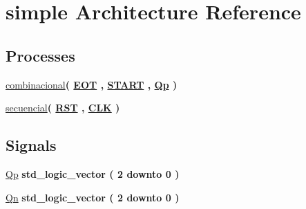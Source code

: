 \hypertarget{class_f_s_m16__control_1_1simple}{}\section{simple Architecture Reference}
\label{class_f_s_m16__control_1_1simple}
\subsection*{Processes}
 \begin{DoxyCompactItemize}
\item 
\hyperlink{class_f_s_m16__control_1_1simple_a523f88e0f05009828cb32efeb2cd80db}{combinacional}{\bfseries  ( {\bfseries {\bfseries \hyperlink{class_f_s_m16__control_a2410fb83e713378bb7e0f7ae0b31ea53}{E\+O\+T}} \textcolor{vhdlchar}{ }} , {\bfseries {\bfseries \hyperlink{class_f_s_m16__control_a85be3e029f471189e7375b9096e537b8}{S\+T\+A\+R\+T}} \textcolor{vhdlchar}{ }} , {\bfseries {\bfseries \hyperlink{class_f_s_m16__control_1_1simple_ab6f0a475b15145a8fb685b8489e07803}{Qp}} \textcolor{vhdlchar}{ }} )}
\item 
\hyperlink{class_f_s_m16__control_1_1simple_aca20da2441863d4ca120eaf8891575c9}{secuencial}{\bfseries  ( {\bfseries {\bfseries \hyperlink{class_f_s_m16__control_a98682ef7de2714e5bab788a2e2ff1b7f}{R\+S\+T}} \textcolor{vhdlchar}{ }} , {\bfseries {\bfseries \hyperlink{class_f_s_m16__control_ab5d0ea9e968d49d94da9db07a979d402}{C\+L\+K}} \textcolor{vhdlchar}{ }} )}
\end{DoxyCompactItemize}
\subsection*{Signals}
 \begin{DoxyCompactItemize}
\item 
\hyperlink{class_f_s_m16__control_1_1simple_ab6f0a475b15145a8fb685b8489e07803}{Qp} {\bfseries \textcolor{comment}{std\+\_\+logic\+\_\+vector}\textcolor{vhdlchar}{ }\textcolor{vhdlchar}{(}\textcolor{vhdlchar}{ }\textcolor{vhdlchar}{ } \textcolor{vhdldigit}{2} \textcolor{vhdlchar}{ }\textcolor{keywordflow}{downto}\textcolor{vhdlchar}{ }\textcolor{vhdlchar}{ } \textcolor{vhdldigit}{0} \textcolor{vhdlchar}{ }\textcolor{vhdlchar}{)}\textcolor{vhdlchar}{ }} 
\item 
\hyperlink{class_f_s_m16__control_1_1simple_adcdb7554a5c6665db8acc4f87f8302b5}{Qn} {\bfseries \textcolor{comment}{std\+\_\+logic\+\_\+vector}\textcolor{vhdlchar}{ }\textcolor{vhdlchar}{(}\textcolor{vhdlchar}{ }\textcolor{vhdlchar}{ } \textcolor{vhdldigit}{2} \textcolor{vhdlchar}{ }\textcolor{keywordflow}{downto}\textcolor{vhdlchar}{ }\textcolor{vhdlchar}{ } \textcolor{vhdldigit}{0} \textcolor{vhdlchar}{ }\textcolor{vhdlchar}{)}\textcolor{vhdlchar}{ }} 
\end{DoxyCompactItemize}



